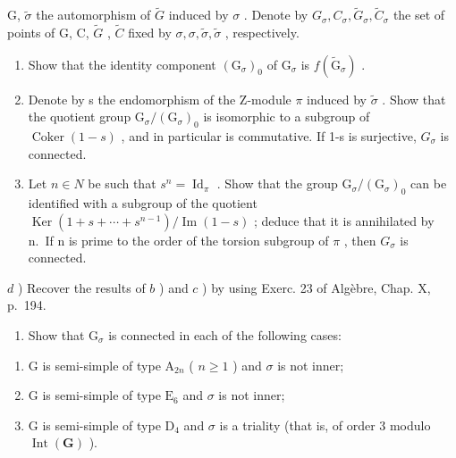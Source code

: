 \begin{enumerate}
G, \(\tilde{\sigma}\) the automorphism of \(\tilde{G}\) induced by \(\sigma\) . Denote by \(G_{\sigma}, C_{\sigma}, \tilde{G}_{\sigma}, \tilde{C}_{\sigma}\) the set of points of G, C, \(\tilde{G}\) , \(\tilde{C}\) fixed by \(\sigma, \sigma, \tilde{\sigma}, \tilde{\sigma}\) , respectively.

\begin{enumerate}
\def\labelenumi{\alph{enumi})}
\item
  Show that the identity component \((\mathrm{G}_{\sigma})_0\) of \(\mathrm{G}_{\sigma}\) is \(f(\tilde{\mathrm{G}}_{\sigma})\) .
\item
  Denote by s the endomorphism of the Z-module \(\pi\) induced by \(\tilde{\sigma}\) . Show that the quotient group \(\mathrm{G}_{\sigma}/(\mathrm{G}_{\sigma})_{0}\) is isomorphic to a subgroup of \(\operatorname{Coker}(1-s)\) , and in particular is commutative. If 1-s is surjective, \(G_{\sigma}\) is connected.
\item
  Let \(n \in N\) be such that \(s^{n} = \operatorname{Id}_{\pi}\) . Show that the group \(\mathrm{G}_{\sigma}/(\mathrm{G}_{\sigma})_{0}\) can be identified with a subgroup of the quotient \(\operatorname{Ker}(1 + s + \cdots + s^{n-1})/\operatorname{Im}(1 - s)\) ; deduce that it is annihilated by n.~If n is prime to the order of the torsion subgroup of \(\pi\) , then \(G_{\sigma}\) is connected.
\end{enumerate}

\(d\) ) Recover the results of \(b\) ) and \(c\) ) by using Exerc. 23 of Algèbre, Chap. X, p.~194.

\begin{enumerate}
\def\labelenumi{\alph{enumi})}
\setcounter{enumi}{4}
\tightlist
\item
  Show that \(\mathrm{G}_{\sigma}\) is connected in each of the following cases:
\end{enumerate}

\begin{enumerate}
\def\labelenumi{(\roman{enumi})}
\item
  G is semi-simple of type \(\mathrm{A}_{2n}\) ( \(n \geq 1\) ) and \(\sigma\) is not inner;
\item
  G is semi-simple of type \(\mathrm{E}_6\) and \(\sigma\) is not inner;
\item
  G is semi-simple of type \(\mathrm{D}_4\) and \(\sigma\) is a triality (that is, of order 3 modulo \(\operatorname{Int}(\mathbf{G})\) ).
\end{enumerate}


\end{enumerate}

